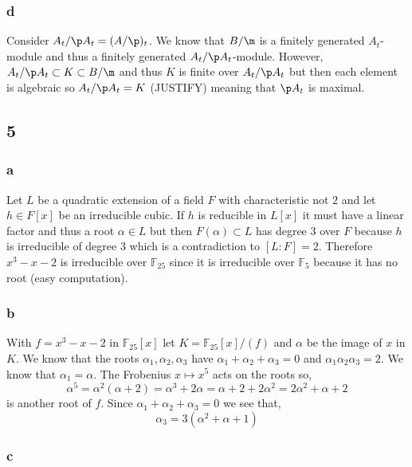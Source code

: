 \documentclass[12pt]{article}
\renewcommand{\F}{\mathbb{F}}
\begin{document}
\subsubsection{d}

Consider $A_t / \p A_t = (A / \p)_t$. We know that $B/\m$ is a finitely generated $A_t$-module and thus a finitely generated $A_t / \p A_t$-module. However, $A_t / \p A_t \subset K \subset B / \m$ and thus $K$ is finite over $A_t / \p A_t$ but then each element is algebraic so $A_t / \p A_t = K$ (JUSTIFY) meaning that $\p A_t$ is maximal.

\subsection{5}

\subsubsection{a}

Let $L$ be a quadratic extension of a field $F$ with characteristic not $2$ and let $h \in F[x]$ be an irreducible cubic. If $h$ is reducible in $L[x]$ it must have a linear factor and thus a root $\alpha \in L$ but then $F(\alpha) \subset L$ has degree $3$ over $F$ because $h$ is irreducible of degree $3$ which is a contradiction to $[L : F] = 2$. Therefore $x^3 - x - 2$ is irreducible over $\F_{25}$ since it is irreducible over $\F_5$ because it has no root (easy computation). 

\subsubsection{b}

With $f = x^3 - x - 2$ in $\F_{25}[x]$ let $K = \F_{25}[x]/(f)$ and $\alpha$ be the image of $x$ in $K$. We know that the roots $\alpha_1, \alpha_2, \alpha_3$ have $\alpha_1 + \alpha_2 + \alpha_3 = 0$ and $\alpha_1 \alpha_2 \alpha_3 = 2$. We know that $\alpha_1 = \alpha$. The Frobenius $x \mapsto x^5$ acts on the roots so,
\[ \alpha^5 = \alpha^2 (\alpha + 2) = \alpha^3 + 2 \alpha = \alpha + 2 + 2 \alpha^2 = 2 \alpha^2 + \alpha  + 2 \]
is another root of $f$. Since $\alpha_1 + \alpha_2 + \alpha_3 = 0$ we see that,
\[ \alpha_3 = 3 (\alpha^2 + \alpha + 1) \] 

\subsubsection{c}
\end{document}
